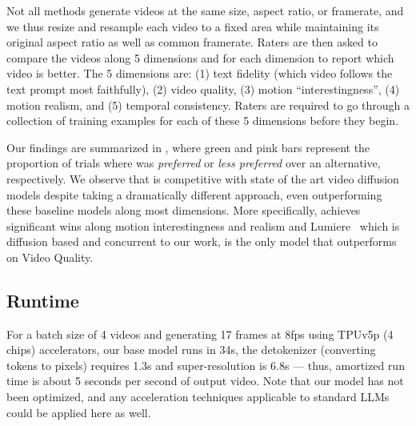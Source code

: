 %
Not all methods generate videos at the same size, aspect ratio, 
or framerate, and we thus resize and resample
each video to a fixed area while maintaining its original aspect ratio as well as common framerate. 
%
Raters are then asked to compare the videos along 5 dimensions and
for each dimension to report which video is better. 
%
The 5 dimensions are: (1) text fidelity (which video follows the text prompt most faithfully), (2) video quality, (3) motion ``interestingness'', (4) motion realism, and (5) temporal consistency.
%
Raters are required to go through a collection of training examples for each of these 5 dimensions before they begin. 

Our findings are summarized in , where
green and pink bars  represent the  proportion  of trials  where \modelname{} was \textit{preferred} 
or \textit{less preferred} over an alternative, respectively.
%
We observe that 
\modelname{} is competitive with state of the art video
diffusion models despite taking a dramatically different approach, even outperforming these baseline models
along most dimensions.  
More specifically,  
\modelname{} achieves significant wins along
motion interestingness and realism and
Lumiere~\cite{bar2024lumiere} which is diffusion based and concurrent to our work, is the only model that outperforms \modelname{} on
Video Quality.







\subsection{Runtime}

For a batch size of 4 videos and generating 17 frames at 8fps using TPUv5p (4 chips) accelerators, our base model runs in 34s, the detokenizer (converting tokens to pixels) requires 1.3s and super-resolution is 6.8s — thus, amortized run time is about 5 seconds per second of output video. Note that our model has not been optimized, and any acceleration techniques applicable to standard LLMs could be applied here as well.